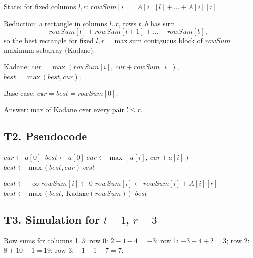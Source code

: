\documentclass[11pt]{article}
\begin{document}
\noindent State: for fixed columns $l, r$: $rowSum[i] = A[i][l] + \dots + A[i][r]$.

\medskip
\noindent Reduction: a rectangle in columns $l..r$, rows $t..b$ has sum
\[
rowSum[t] + rowSum[t+1] + \dots + rowSum[b],
\]
so the best rectangle for fixed $l, r$ = max sum contiguous block of $rowSum$ = maximum subarray (Kadane).

\medskip
\noindent Kadane: $cur = \max(rowSum[i],\ cur + rowSum[i])$, $best = \max(best, cur)$.

\medskip
\noindent Base case: $cur = best = rowSum[0]$.

\medskip
\noindent Answer: max of Kadane over every pair $l \le r$.

\subsection*{T2. Pseudocode}

\begin{algorithm}[H]
\caption{Kadane$(a[0..m-1])$ (helper, from the lecture notes)}
\begin{algorithmic}[1]
\State $cur \gets a[0]$, $best \gets a[0]$
  \State $cur \gets \max(a[i],\ cur + a[i])$
  \State $best \gets \max(best, cur)$
\EndFor
\State \Return $best$
\end{algorithmic}
\end{algorithm}

\begin{algorithm}[H]
\caption{MaxRectangle$(A, m, n)$}
\begin{algorithmic}[1]
\State $best \gets -\infty$
    \State $rowSum[i] \gets 0$
  \EndFor
      \State $rowSum[i] \gets rowSum[i] + A[i][r]$
    \EndFor
    \State $best \gets \max(best,\ \text{Kadane}(rowSum))$
  \EndFor
\EndFor
\State \Return $best$
\end{algorithmic}
\end{algorithm}

\subsection*{T3. Simulation for $l = 1$, $r = 3$}

Row sums for columns 1..3: row 0: $2 - 1 - 4 = -3$; row 1: $-3 + 4 + 2 = 3$; row 2: $8 + 10 + 1 = 19$; row 3: $-1 + 1 + 7 = 7$.
\end{document}
